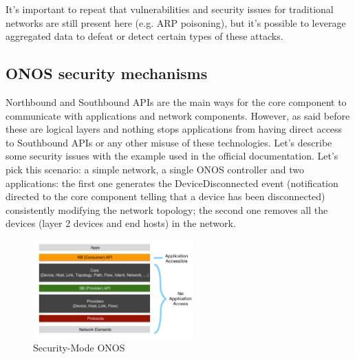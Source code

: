 It's important to repeat that vulnerabilities and security issues for traditional networks are still present here (e.g. ARP poisoning), but it's possible to leverage aggregated data to defeat or detect certain types of these attacks.

\subsection{ONOS security mechanisms}
Northbound and Southbound APIs are the main ways for the core component to communicate with applications and network components. However, as said before these are logical layers and nothing stops applications from having direct access to Southbound APIs or any other misuse of these technologies. Let's describe some security issues with the example used in the official documentation. Let's pick this scenario: a simple network, a single ONOS controller and two applications: the first one generates the DeviceDisconnected event (notification directed to the core component telling that a device has been disconnected) consistently modifying the network topology; the second one removes all the devices (layer 2 devices and end hosts) in the network.
\begin{figure}
\caption{Security-Mode ONOS}
\label{fig:secmode}
\includegraphics[width=0.55\textwidth]{resources/Chapter-1/sec-mode.png}
\end{figure}
